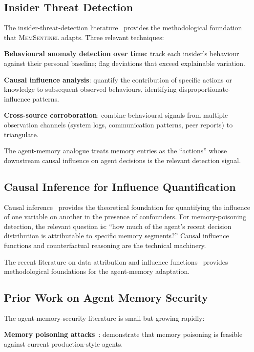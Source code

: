 \documentclass[sigconf,nonacm]{acmart}
\begin{document}
\subsection{Insider Threat Detection}

The insider-threat-detection literature~\cite{liu2024insidersurv,
carnegiemellon2024cert} provides the methodological foundation that
\textsc{MemSentinel} adapts. Three relevant techniques:

\textbf{Behavioural anomaly detection over time}: track each insider's
behaviour against their personal baseline; flag deviations that exceed
explainable variation.

\textbf{Causal influence analysis}: quantify the contribution of
specific actions or knowledge to subsequent observed behaviours,
identifying disproportionate-influence patterns.

\textbf{Cross-source corroboration}: combine behavioural signals from
multiple observation channels (system logs, communication patterns,
peer reports) to triangulate.

The agent-memory analogue treats memory entries as the ``actions''
whose downstream causal influence on agent decisions is the relevant
detection signal.

\subsection{Causal Inference for Influence Quantification}

Causal inference~\cite{pearl2009causality} provides the theoretical
foundation for quantifying the influence of one variable on another
in the presence of confounders. For memory-poisoning detection, the
relevant question is: ``how much of the agent's recent decision
distribution is attributable to specific memory segments?'' Causal
influence functions and counterfactual reasoning are the technical
machinery.

The recent literature on data attribution and influence
functions~\cite{koh2017influence,park2024dataattribution} provides
methodological foundations for the agent-memory adaptation.

\subsection{Prior Work on Agent Memory Security}

The agent-memory-security literature is small but growing rapidly:

\textbf{Memory poisoning attacks}~\cite{chen2024memorypoisoning,
zhao2025agentbackdoor,liu2025agentpoison}: demonstrate that memory
poisoning is feasible against current production-style agents.
\end{document}
